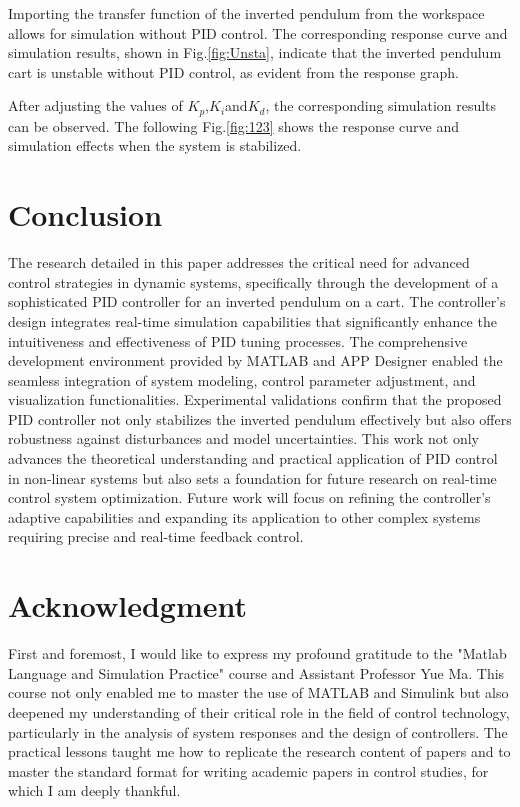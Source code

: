 \documentclass[journal,twoside,web]{ieeecolor}
\begin{document}
Importing the transfer function of the inverted pendulum from the workspace allows for simulation without PID control. The corresponding response curve and simulation results, shown in Fig.\ref{fig:Unsta}, indicate that the inverted pendulum cart is unstable without PID control, as evident from the response graph.

After adjusting the values of $K_p$,$K_i$and$K_d$, the corresponding simulation results can be observed. The following Fig.\ref{fig:123} shows the response curve and simulation effects when the system is stabilized.



\section{Conclusion}
The research detailed in this paper addresses the critical need for advanced control strategies in dynamic systems, specifically through the development of a sophisticated PID controller for an inverted pendulum on a cart. The controller's design integrates real-time simulation capabilities that significantly enhance the intuitiveness and effectiveness of PID tuning processes. The comprehensive development environment provided by MATLAB and APP Designer enabled the seamless integration of system modeling, control parameter adjustment, and visualization functionalities. Experimental validations confirm that the proposed PID controller not only stabilizes the inverted pendulum effectively but also offers robustness against disturbances and model uncertainties. This work not only advances the theoretical understanding and practical application of PID control in non-linear systems but also sets a foundation for future research on real-time control system optimization. Future work will focus on refining the controller's adaptive capabilities and expanding its application to other complex systems requiring precise and real-time feedback control.

\section*{Acknowledgment}

First and foremost, I would like to express my profound gratitude to the "Matlab Language and Simulation Practice" course and Assistant Professor Yue Ma. This course not only enabled me to master the use of MATLAB and Simulink but also deepened my understanding of their critical role in the field of control technology, particularly in the analysis of system responses and the design of controllers. The practical lessons taught me how to replicate the research content of papers and to master the standard format for writing academic papers in control studies, for which I am deeply thankful.
\end{document}
